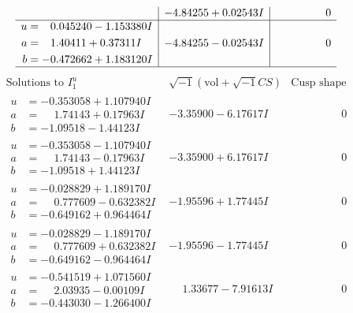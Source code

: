 \documentclass[1p]{elsarticle_modified}
\theoremstyle{definition}
\newcommand{\I}{\sqrt{-1}}
\begin{document}
$$\begin{array}{c|c|c}
 & -4.84255 + 0.02543 I & \phantom{-0.000000 } 0 \\ \hline\begin{aligned}
u &= \phantom{-}0.045240 - 1.153380 I \\
a &= \phantom{-}1.40411 + 0.37311 I \\
b &= -0.472662 + 1.183120 I\end{aligned}
 & -4.84255 - 0.02543 I & \phantom{-0.000000 } 0\\
 \hline 
 \end{array}$$\newpage$$\begin{array}{c|c|c}  
\text{Solutions to }I^u_{1}& \I (\text{vol} + \sqrt{-1}CS) & \text{Cusp shape}\\
 \hline 
\begin{aligned}
u &= -0.353058 + 1.107940 I \\
a &= \phantom{-}1.74143 + 0.17963 I \\
b &= -1.09518 - 1.44123 I\end{aligned}
 & -3.35900 - 6.17617 I & \phantom{-0.000000 } 0 \\ \hline\begin{aligned}
u &= -0.353058 - 1.107940 I \\
a &= \phantom{-}1.74143 - 0.17963 I \\
b &= -1.09518 + 1.44123 I\end{aligned}
 & -3.35900 + 6.17617 I & \phantom{-0.000000 } 0 \\ \hline\begin{aligned}
u &= -0.028829 + 1.189170 I \\
a &= \phantom{-}0.777609 - 0.632382 I \\
b &= -0.649162 + 0.964464 I\end{aligned}
 & -1.95596 + 1.77445 I & \phantom{-0.000000 } 0 \\ \hline\begin{aligned}
u &= -0.028829 - 1.189170 I \\
a &= \phantom{-}0.777609 + 0.632382 I \\
b &= -0.649162 - 0.964464 I\end{aligned}
 & -1.95596 - 1.77445 I & \phantom{-0.000000 } 0 \\ \hline\begin{aligned}
u &= -0.541519 + 1.071560 I \\
a &= \phantom{-}2.03935 - 0.00109 I \\
b &= -0.443030 - 1.266400 I\end{aligned}
 & \phantom{-}1.33677 - 7.91613 I & \phantom{-0.000000 } 0 \\ \hline\begin{aligned}

\end{aligned}
\end{array}$$
\end{document}
